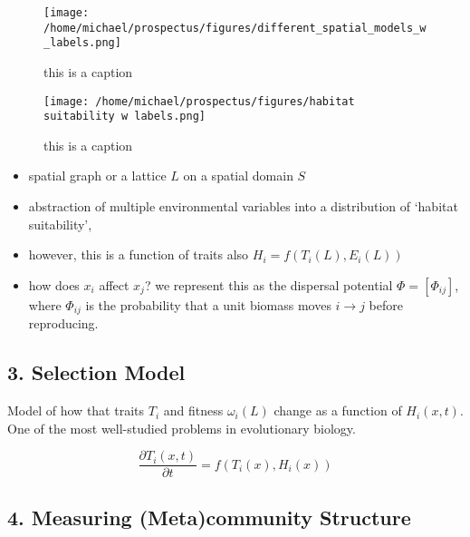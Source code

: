 \begin{figure}
\centering
\texttt{[image: /home/michael/prospectus/figures/different\_spatial\_models\_w\_labels.png]}
\caption{this is a caption}
\end{figure}

\begin{figure}
\centering
\texttt{[image: /home/michael/prospectus/figures/habitat suitability w labels.png]}
\caption{this is a caption}
\end{figure}

\begin{itemize}
\item
  spatial graph or a lattice \(L\) on a spatial domain \(S\)
\item
  abstraction of multiple environmental variables into a distribution of
  `habitat suitability',
\item
  however, this is a function of traits also \(H_i= f(T_i(L), E_i(L))\)
\item
  how does \(x_i\) affect \(x_j\)? we represent this as the dispersal
  potential \(\Phi = [\Phi_{ij}]\), where \(\Phi_{ij}\) is the
  probability that a unit biomass moves \(i \to j\) before reproducing.
\end{itemize}

\hypertarget{selection-model}{%
\subsection{3. Selection Model}\label{selection-model}}

Model of how that traits \(T_i\) and fitness \(\omega_i(L)\) change as a
function of \(H_i(x,t)\). One of the most well-studied problems in
evolutionary biology.

\[\frac{\partial T_i(x,t)}{\partial t} = f(T_i(x), H_i(x))\]

\hypertarget{measuring-metacommunity-structure}{%
\subsection{4. Measuring (Meta)community
Structure}\label{measuring-metacommunity-structure}}


